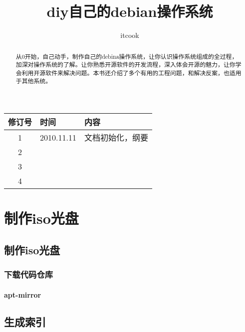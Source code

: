 \documentclass[a4paper,10pt]{article}
\title{diy自己的debian操作系统}
\author{itcook}
\begin{document}
\begin{CJK}{UTF8}{gbsn}

\maketitle

\begin{abstract}
从0开始，自己动手，制作自己的debina操作系统，让你认识操作系统组成的全过程，加深对操作系统的了解。让你熟悉开源软件的开发流程，深入体会开源的魅力，让你学会利用开源软件来解决问题。本书还介绍了多个有用的工程问题，和解决反案，也适用于其他系统。
\end{abstract}

\CJKindent
\newpage
\tableofcontents
\setcounter{tocdepth}{3}



\newpage
\begin{center}
\begin{tabular}{|c|l|l|}
    \hline
    修订号 & 时间 & 内容 \\
    \hline
    1 & 2010.11.11 & 文档初始化，纲要 \\
    \hline
    2 &  &  \\
    \hline
    3 &  &  \\
    \hline
    4 &  &  \\
    \hline
\end{tabular}
\end{center}
\newpage

\part{制作iso光盘}
\chapter{制作iso光盘}
\section{下载代码仓库}
\subsection{apt-mirror}
\subsubsection{}

\chapter{生成索引}


\end{CJK}
\end{document}
